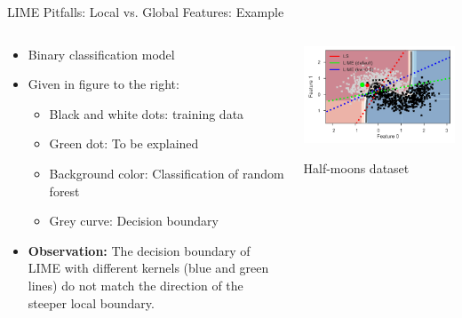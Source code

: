 \documentclass[11pt,compress,t,notes=noshow, aspectratio=169, xcolor=table]{beamer}
\begin{document}
\begin{vbframe}{LIME Pitfalls: Local vs. Global Features: Example }

\begin{columns}
	\begin{column}{0.6\textwidth}
		\begin{itemize}
		\item Binary classification model
		\item Given in figure to the right:
		\begin{itemize}
		    \item Black and white dots: training data
		    \item Green dot: To be explained
		    \item Background color: Classification of random forest
		    \item Grey curve: Decision boundary
		\end{itemize}
		\item \textbf{Observation: }The decision boundary of LIME with different kernels (blue and green lines) do not match the direction of the steeper local boundary. 
	\end{itemize}
\end{column}
\begin{column}{0.39\textwidth}
\vspace{0.3cm}

	\begin{center}
	\includegraphics[width=1\textwidth]{figure/lime-globallocal2}

	{Half-moons dataset}
	
\end{center}

	\end{column}
\end{columns}
\end{vbframe}
\end{document}
